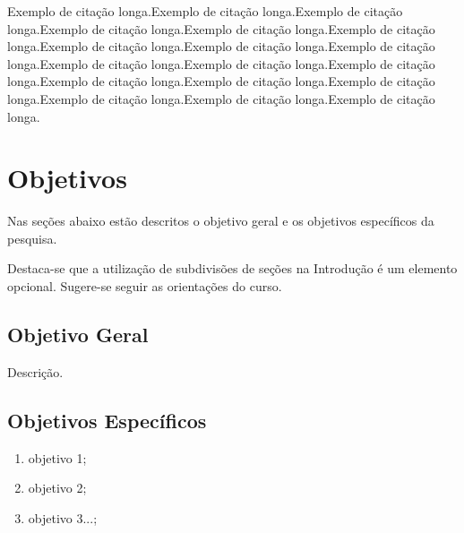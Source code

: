 \begin{citacao}
Exemplo de citação longa.Exemplo de citação longa.Exemplo de citação longa.Exemplo de citação longa.Exemplo de citação longa.Exemplo de citação longa.Exemplo de citação longa.Exemplo de citação longa.Exemplo de citação longa.Exemplo de citação longa.Exemplo de citação longa.Exemplo de citação longa.Exemplo de citação longa.Exemplo de citação longa.Exemplo de citação longa.Exemplo de citação longa.Exemplo de citação longa.Exemplo de citação longa.
\end{citacao}

\section{Objetivos}
Nas seções abaixo estão descritos o objetivo geral e os objetivos específicos da pesquisa.

Destaca-se que a utilização de subdivisões de seções na Introdução é um elemento opcional. Sugere-se seguir as orientações do curso. 
\subsection{\textbf{Objetivo Geral}}
Descrição.


\subsection{\textbf{Objetivos Específicos}}

\begin{enumerate}[label=\alph*)]
    \item objetivo 1;
    \item objetivo 2;
    \item objetivo 3...;
\end{enumerate}